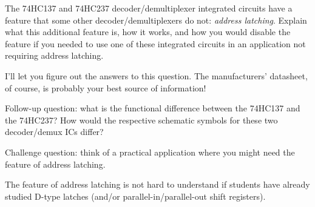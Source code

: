 

The 74HC137 and 74HC237 decoder/demultiplexer integrated circuits have a feature that some other decoder/demultiplexers do not: {\it address latching}.  Explain what this additional feature is, how it works, and how you would disable the feature if you needed to use one of these integrated circuits in an application not requiring address latching.







I'll let you figure out the answers to this question.  The manufacturers' datasheet, of course, is probably your best source of information!

\vskip 10pt

Follow-up question: what is the functional difference between the 74HC137 and the 74HC237?  How would the respective schematic symbols for these two decoder/demux ICs differ?

\vskip 10pt

Challenge question: think of a practical application where you might need the feature of address latching.







The feature of address latching is not hard to understand if students have already studied D-type latches (and/or parallel-in/parallel-out shift registers).




